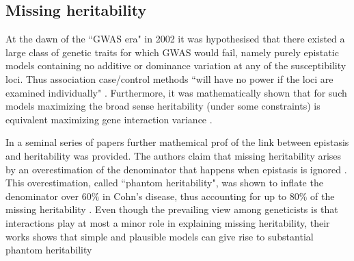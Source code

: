 
\subsection{Missing heritability}

At the dawn of the ``GWAS era" in 2002 it was hypothesised that there existed a large class of genetic traits for which GWAS would fail, namely purely epistatic models containing no additive or dominance variation at any of the susceptibility loci. 
Thus association case/control methods ``will have no power if the loci are examined individually" \cite{culverhouse2002perspective}.
Furthermore, it was mathematically shown that for such models maximizing the broad sense heritability (under some constraints) is equivalent maximizing gene interaction variance \cite{culverhouse2002perspective}.

In a seminal series of papers \cite{zuk2012mystery, zuk2014searching} further mathemical prof of the link between epistasis and heritability was provided.
The authors claim that missing heritability arises by an overestimation of the denominator that happens when epistasis is ignored \cite{zuk2012mystery}.
This overestimation, called ``phantom heritability", was shown to inflate the denominator over $60\%$ in Cohn's disease, thus accounting for up to $80\%$ of the missing heritability \cite{zuk2012mystery}.
Even though the prevailing view among geneticists is that interactions play at most a minor role in explaining missing heritability, their works shows that simple and plausible models can give rise to substantial phantom heritability \cite{zuk2012mystery}

